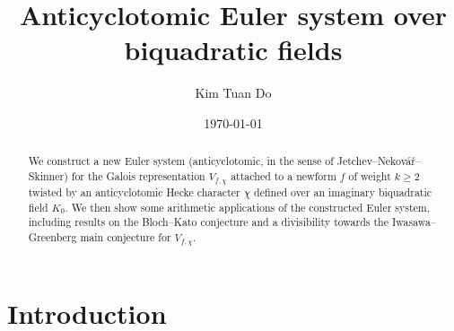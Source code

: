 \documentclass[10pt,letterpaper]{amsart}
\theoremstyle{plain}
\theoremstyle{definition}
\theoremstyle{definition}
\theoremstyle{plain}
\theoremstyle{plain}
\theoremstyle{plain}
\theoremstyle{remark}
\numberwithin{equation}{section}
\begin{document}
	
\title{Anticyclotomic Euler system over biquadratic fields}
\author[K.\,T.\,Do]{Kim Tuan Do}
	
\date{\today} %
		

\address[]{Department of Mathematics, University of California Los Angeles, CA 90095, USA}
\address[]{Department of Mathematics, University of California Santa Barbara, CA 93106, USA}




\begin{abstract}
We construct a new Euler system (anticyclotomic, in the sense of Jetchev--Nekov\'a{\v r}--Skinner) for the Galois representation $V_{f,\chi}$ attached to a newform $f$ of weight $k\geq 2$ twisted by an anticyclotomic Hecke character $\chi$ defined over an imaginary biquadratic field $K_0$. We then show some arithmetic applications of the constructed Euler system, including results on the Bloch--Kato conjecture and a divisibility towards the Iwasawa--Greenberg main conjecture for $V_{f,\chi}$. 


\end{abstract}


\maketitle
\setcounter{tocdepth}{2}
\tableofcontents







\newpage
\section{Introduction}

\end{document}
